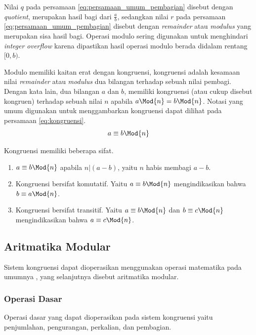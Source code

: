 Nilai $ q $ pada persamaan \eqref{eq:persamaan_umum_pembagian} disebut dengan \textit{quotient}, merupakan hasil bagi dari $ \frac{a}{b} $, sedangkan nilai $ r $ pada persamaan \eqref{eq:persamaan_umum_pembagian} disebut dengan \textit{remainder} atau \textit{modulus} yang merupakan sisa hasil bagi. Operasi modulo sering digunakan untuk menghindari \textit{integer overflow} karena dipastikan hasil operasi modulo berada didalam rentang $ [0,b) $.

Modulo memiliki kaitan erat dengan kongruensi, kongruensi adalah kesamaan nilai \textit{remainder} atau \textit{modulus} dua bilangan terhadap sebuah nilai pembagi. Dengan kata lain, dua bilangan $ a $ dan $ b $, memiliki kongruensi (atau cukup disebut kongruen) terhadap sebuah nilai $ n $ apabila $a \Mod{n}=b \Mod{n}$. Notasi yang umum digunakan untuk menggambarkan kongruensi dapat dilihat pada persamaan \eqref{eq:kongruensi}.
\begin{equation}
	a\equiv b \Mod{n}
	\label{eq:kongruensi}
\end{equation}

Kongruensi memiliki beberapa sifat.\cite{stallings_cryptography}
\begin{enumerate}
	\item $ a\equiv b \Mod{n} $ apabila $ n|(a - b) $, yaitu $ n $ habis membagi $ a-b $.
	\item Kongruensi bersifat komutatif. Yaitu $ a\equiv b \Mod{n} $ mengindikasikan bahwa $ b\equiv a \Mod{n} $.
	\item Kongruensi bersifat transitif. Yaitu $ a\equiv b \Mod{n} $ dan $ b\equiv c \Mod{n} $ mengindikasikan bahwa $a \equiv c \Mod{n} $.
\end{enumerate}

\subsection{ Aritmatika Modular}
Sistem kongruensi dapat dioperasikan menggunakan operasi matematika pada umumnya \cite{stallings_cryptography}, yang selanjutnya disebut aritmatika modular.

\subsubsection{ Operasi Dasar}
Operasi dasar yang dapat dioperasikan pada sistem kongruensi yaitu penjumlahan, pengurangan, perkalian, dan pembagian.

